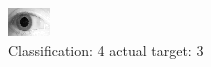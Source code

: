 \begin{figure}[h!]
\begin{center}
\includegraphics[width=0.60\columnwidth]{figures/ID1873_class_4_target_3.png}
\end{center}
\caption{ Classification: 4 actual target: 3}
\label{fig:ID1873_class_4_target_3}
\end{figure}
